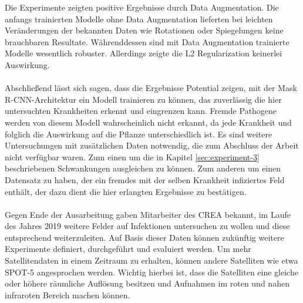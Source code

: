 Die Experimente zeigten positive Ergebnisse durch Data Augmentation. Die anfangs trainierten Modelle ohne Data Augmentation lieferten bei leichten Veränderungen der bekannten Daten wie Rotationen oder Spiegelungen keine brauchbaren Resultate. Währenddessen sind mit Data Augmentation trainierte Modelle wesentlich robuster. Allerdings zeigte die L2 Regularization keinerlei Auswirkung.
\\\\
Abschließend lässt sich sagen, dass die Ergebnisse Potential zeigen, mit der Mask R-CNN-Architektur ein Modell trainieren zu können, das zuverlässig die hier untersuchten Krankheiten erkennt und eingrenzen kann. Fremde Pathogene werden von diesem Modell wahrscheinlich nicht erkannt, da jede Krankheit und folglich die Auswirkung auf die Pflanze unterschiedlich ist. Es sind weitere Untersuchungen mit zusätzlichen Daten notwendig, die zum Abschluss der Arbeit nicht verfügbar waren. Zum einen um die in Kapitel \ref{sec:experiment-3} beschriebenen Schwankungen ausgleichen zu können. Zum anderen um einen Datensatz zu haben, der ein fremdes mit der selben Krankheit infiziertes Feld enthält, der dazu dient die hier erlangten Ergebnisse zu bestätigen. 
\\\\
Gegen Ende der Ausarbeitung gaben Mitarbeiter des CREA bekannt, im Laufe des Jahres 2019 weitere Felder auf Infektionen untersuchen zu wollen und diese entsprechend weiterzuleiten. Auf Basis dieser Daten können zukünftig weitere Experimente definiert, durchgeführt und evaluiert werden. Um mehr Satellitendaten in einem Zeitraum zu erhalten, können andere Satelliten wie etwa SPOT-5 angesprochen werden. Wichtig hierbei ist, dass die Satelliten eine gleiche oder höhere räumliche Auflösung besitzen und Aufnahmen im roten und nahen infraroten Bereich machen können.
